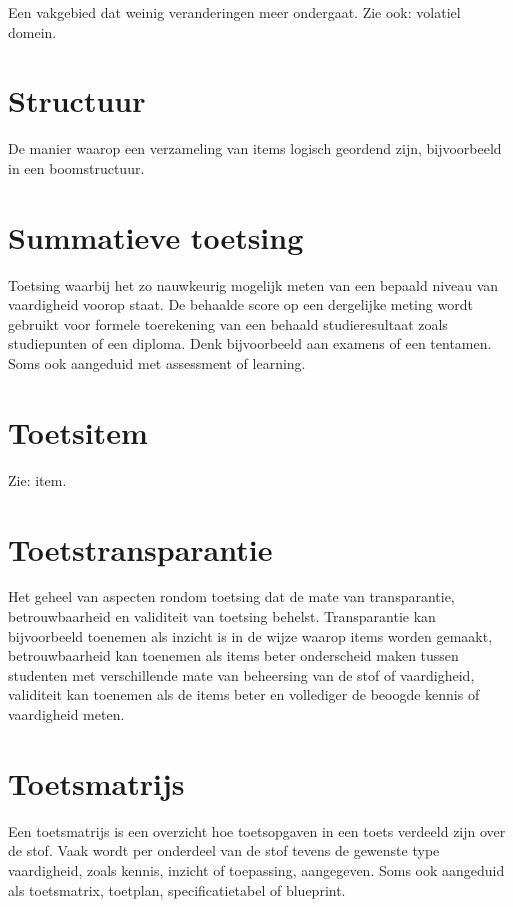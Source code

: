 \documentclass[
  letterpaper,
  DIV=11,
  numbers=noendperiod]{scrreprt}
\begin{document}
Een vakgebied dat weinig veranderingen meer ondergaat. Zie ook: volatiel
domein.

\hypertarget{structuur}{%
\section{Structuur}\label{structuur}}

De manier waarop een verzameling van items logisch geordend zijn,
bijvoorbeeld in een boomstructuur.

\hypertarget{summatieve-toetsing}{%
\section{Summatieve toetsing}\label{summatieve-toetsing}}

Toetsing waarbij het zo nauwkeurig mogelijk meten van een bepaald niveau
van vaardigheid voorop staat. De behaalde score op een dergelijke meting
wordt gebruikt voor formele toerekening van een behaald studieresultaat
zoals studiepunten of een diploma. Denk bijvoorbeeld aan examens of een
tentamen. Soms ook aangeduid met assessment of learning.

\hypertarget{toetsitem}{%
\section{Toetsitem}\label{toetsitem}}

Zie: item.

\hypertarget{toetstransparantie}{%
\section{Toetstransparantie}\label{toetstransparantie}}

Het geheel van aspecten rondom toetsing dat de mate van transparantie,
betrouwbaarheid en validiteit van toetsing behelst. Transparantie kan
bijvoorbeeld toenemen als inzicht is in de wijze waarop items worden
gemaakt, betrouwbaarheid kan toenemen als items beter onderscheid maken
tussen studenten met verschillende mate van beheersing van de stof of
vaardigheid, validiteit kan toenemen als de items beter en vollediger de
beoogde kennis of vaardigheid meten.

\hypertarget{toetsmatrijs}{%
\section{Toetsmatrijs}\label{toetsmatrijs}}

Een toetsmatrijs is een overzicht hoe toetsopgaven in een toets verdeeld
zijn over de stof. Vaak wordt per onderdeel van de stof tevens de
gewenste type vaardigheid, zoals kennis, inzicht of toepassing,
aangegeven. Soms ook aangeduid als toetsmatrix, toetplan,
specificatietabel of blueprint.
\end{document}
